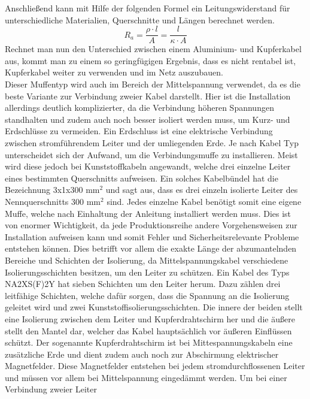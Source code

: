 Anschließend kann mit Hilfe der folgenden Formel ein Leitungswiderstand für unterschiedliche Materialien, Querschnitte und Längen berechnet werden.
\begin{equation}
R_a=\frac{\rho \cdot l}{A}=\frac{l}{\kappa \cdot A}
\label{eqn:Leitungswiderstand}
\end{equation}
Rechnet man nun den Unterschied zwischen einem Aluminium- und Kupferkabel aus, kommt man zu einem so geringfügigen Ergebnis, dass es nicht rentabel ist, 
Kupferkabel weiter zu verwenden und im Netz auszubauen. \\
Dieser Muffentyp wird auch im Bereich der Mittelspannung verwendet, da es die beste Variante zur Verbindung zweier Kabel darstellt. Hier ist die Installation 
allerdings deutlich komplizierter, da die Verbindung höheren Spannungen standhalten und zudem auch noch besser isoliert werden muss, um Kurz- und Erdschlüsse 
zu vermeiden. Ein Erdschluss ist eine elektrische Verbindung zwischen stromführendem Leiter und der umliegenden Erde. Je nach Kabel Typ unterscheidet sich der 
Aufwand, um die Verbindungsmuffe zu installieren. Meist wird diese jedoch bei Kunststoffkabeln angewandt, welche drei einzelne Leiter eines bestimmten 
Querschnitts aufweisen. Ein solches Kabelbündel hat die Bezeichnung 3x1x300 mm$^2$ und sagt aus, dass es drei einzeln isolierte Leiter des Nennquerschnitts 
300 mm$^2$ sind. %
Jedes einzelne Kabel benötigt somit eine eigene Muffe, welche nach Einhaltung der Anleitung installiert werden muss. Dies ist von enormer Wichtigkeit, da jede 
Produktionsreihe andere Vorgehensweisen zur Installation aufweisen kann und somit Fehler und Sicherheitsrelevante Probleme entstehen können. Dies betrifft 
vor allem die exakte Länge der abzumantelnden Bereiche und Schichten der Isolierung, da Mittelspannungskabel verschiedene Isolierungsschichten besitzen, um 
den Leiter zu schützen. Ein Kabel des Typs NA2XS(F)2Y hat \zB sieben Schichten um den Leiter herum. Dazu zählen drei leitfähige Schichten, welche dafür 
sorgen, dass die Spannung an die Isolierung geleitet wird und zwei Kunststoffisolierungsschichten. Die innere der beiden stellt eine Isolierung zwischen dem 
Leiter und Kupferdrahtschirm her und die äußere stellt den Mantel dar, welcher das Kabel hauptsächlich vor äußeren Einflüssen schützt. Der sogenannte 
Kupferdrahtschirm ist bei Mittespannungskabeln eine zusätzliche Erde und dient zudem auch noch zur Abschirmung elektrischer Magnetfelder. Diese Magnetfelder 
entstehen bei jedem stromdurchflossenen Leiter und müssen vor allem bei Mittelspannung eingedämmt werden. Um bei einer Verbindung zweier Leiter 
